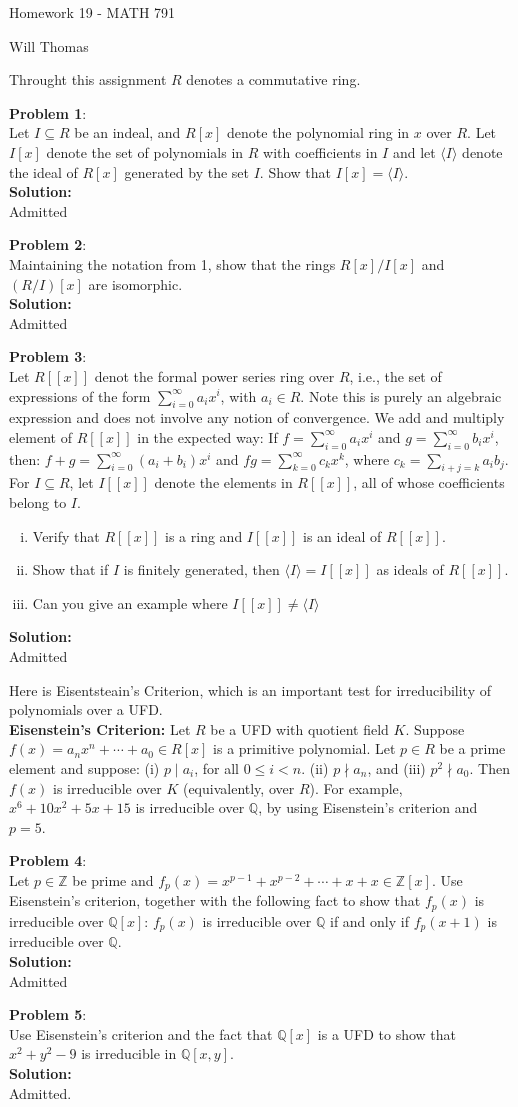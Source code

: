 \documentclass[11pt]{article}
\newcommand{\prob}[3]{\begin{flushleft}
        \textbf{Problem #1}: \\
        #2 
		\textbf{Solution:} 
		#3

\end{flushleft}}
\newcommand{\makeHWtitle}[1]{
    \begin{center}
    \Large{Homework #1 - MATH 791} 
        \vspace{5pt}
        
        \normalsize{Will Thomas}
        \vspace{5pt}
    \end{center}
}
\begin{document}
\makeHWtitle{19}
Throught this assignment $R$ denotes a commutative ring.

\prob{1}{
  Let $I \subseteq R$ be an indeal, and $R[x]$ denote the polynomial ring in $x$ over $R$. Let $I[x]$ denote the set of polynomials in $R$ with coefficients in $I$ and let $\langle I \rangle$ denote the ideal of $R[x]$ generated by the set $I$.
  Show that $I[x] = \langle I \rangle$. \\
}{ \\
  Admitted
}

\prob{2}{
Maintaining the notation from 1, show that the rings $R[x]/I[x]$ and $(R/I)[x]$ are isomorphic. \\
}{\\
Admitted
}

\prob{3}{
  Let $R[[x]]$ denot the formal power series ring over $R$, i.e., the set of expressions of the form $\sum_{i = 0}^{\infty}a_ix^i$, with $a_i \in R$.
  Note this is purely an algebraic expression and does not involve any notion of convergence.
  We add and multiply element of $R[[x]]$ in the expected way:
  If $f = \sum_{i=0}^{\infty}a_ix^i$ and $g = \sum_{i=0}^{\infty}b_ix^i$, then:
  $f + g = \sum_{i=0}^{\infty}(a_i + b_i)x^i$ and $fg = \sum_{k=0}^{\infty}c_kx^k$, where $c_k = \sum_{i + j = k}a_ib_j$. For $I \subseteq R$, let $I[[x]]$ denote the elements in $R[[x]]$, all of whose coefficients belong to $I$.
  \begin{enumerate}[(i)]
    \item Verify that $R[[x]]$ is a ring and $I[[x]]$ is an ideal of $R[[x]]$.
    \item Show that if $I$ is finitely generated, then $\langle I \rangle = I[[x]]$ as ideals of $R[[x]]$.
    \item Can you give an example where $I[[x]] \neq \langle I \rangle$
  \end{enumerate}
}{ \\
  Admitted
}
Here is Eisentsteain's Criterion, which is an important test for irreducibility of polynomials over a UFD. \\
\textbf{Eisenstein's Criterion:} Let $R$ be a UFD with quotient field $K$.
Suppose $f(x) = a_nx^n + \cdots + a_0 \in R[x]$ is a primitive polynomial.
Let $p \in R$ be a prime element and suppose: (i) $p \mid a_i$, for all $0 \leq i < n$.
(ii) $p \nmid a_n$, and (iii) $p^2 \nmid a_0$.
Then $f(x)$ is irreducible over $K$ (equivalently, over $R$).
For example, $x^6 + 10x^2 + 5x + 15$ is irreducible over $\mathbb{Q}$, by using Eisenstein's criterion and $p = 5$.

\prob{4}{
  Let $p \in \mathbb{Z}$ be prime and $f_p(x) = x^{p-1} + x^{p-2} + \cdots + x + x \in \mathbb{Z}[x]$. Use Eisenstein's criterion, together with the following fact to show that $f_p(x)$ is irreducible over $\mathbb{Q}[x]$: $f_p(x)$ is irreducible over $\mathbb{Q}$ if and only if $f_p(x + 1)$ is irreducible over $\mathbb{Q}$. \\
}{ \\
  Admitted
}

\prob{5}{
  Use Eisenstein's criterion and the fact that $\mathbb{Q}[x]$ is a UFD to show that $x^2 + y^2 - 9$ is irreducible in $\mathbb{Q}[x,y]$. \\
}{ \\
  Admitted.
}
\end{document}
